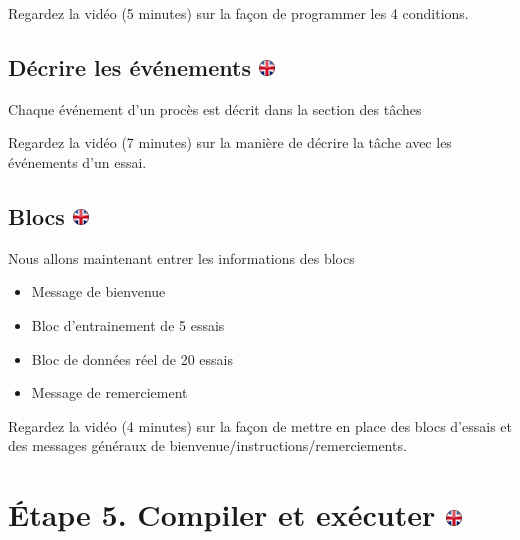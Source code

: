 \documentclass[
]{book}
\providecommand{\tightlist}{%
  \setlength{\itemsep}{0pt}\setlength{\parskip}{0pt}}
\begin{document}
Regardez la vidéo (5 minutes) sur la façon de programmer les 4
conditions.

\hypertarget{duxe9crire-les-uxe9vuxe9nements}{%
\subsection[Décrire les événements ]{\texorpdfstring{Décrire les
événements
\href{https://www.psytoolkit.org/lessons/project.html\#_describing_events}{\protect\includegraphics{img/ukflag.png}}}{Décrire les événements }}\label{duxe9crire-les-uxe9vuxe9nements}}

Chaque événement d'un procès est décrit dans la section des tâches

Regardez la vidéo (7 minutes) sur la manière de décrire la tâche avec
les événements d'un essai.

\hypertarget{blocs}{%
\subsection[Blocs ]{\texorpdfstring{Blocs
\href{https://www.psytoolkit.org/lessons/project.html\#_blocks}{\protect\includegraphics{img/ukflag.png}}}{Blocs }}\label{blocs}}

Nous allons maintenant entrer les informations des blocs

\begin{itemize}
\tightlist
\item
  Message de bienvenue
\item
  Bloc d'entrainement de 5 essais
\item
  Bloc de données réel de 20 essais
\item
  Message de remerciement
\end{itemize}

Regardez la vidéo (4 minutes) sur la façon de mettre en place des blocs
d'essais et des messages généraux de
bienvenue/instructions/remerciements.

\hypertarget{uxe9tape-5.-compiler-et-exuxe9cuter}{%
\section[Étape 5. Compiler et exécuter ]{\texorpdfstring{Étape 5.
Compiler et exécuter
\href{https://www.psytoolkit.org/lessons/project.html\#_step_5_compile_and_run}{\protect\includegraphics{img/ukflag.png}}}{Étape 5. Compiler et exécuter }}\label{uxe9tape-5.-compiler-et-exuxe9cuter}}
\end{document}
